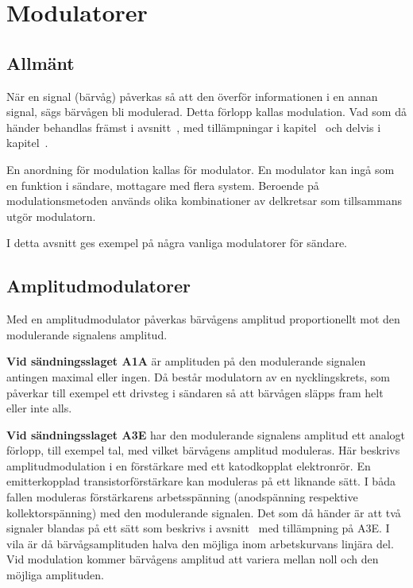 
\section{Modulatorer}

\subsection{Allmänt}

När en signal (bärvåg) påverkas så att den överför informationen i en annan
signal, sägs bärvågen bli modulerad.
Detta förlopp kallas modulation.
Vad som då händer behandlas främst i avsnitt~, med
tillämpningar i kapitel~ och delvis i kapitel~.

En anordning för modulation kallas för modulator.
En modulator kan ingå som en funktion i sändare, mottagare med flera system.
Beroende på modulationsmetoden används olika kombinationer av delkretsar som
tillsammans utgör modulatorn.

I detta avsnitt ges exempel på några vanliga modulatorer för sändare.

\subsection{Amplitudmodulatorer}

Med en amplitudmodulator påverkas bärvågens amplitud proportionellt
mot den modulerande signalens amplitud.

\textbf{Vid sändningsslaget A1A} är amplituden på den modulerande signalen
antingen maximal eller ingen.
Då består modulatorn av en nycklingskrets, som påverkar till exempel ett
drivsteg i sändaren så att bärvågen släpps fram helt eller inte alls.

\textbf{Vid sändningsslaget A3E} har den modulerande signalens amplitud
ett analogt förlopp, till exempel tal, med vilket bärvågens amplitud moduleras.
Här beskrivs amplitudmodulation i en förstärkare med ett katodkopplat
elektronrör.
En emitterkopplad transistorförstärkare kan moduleras på ett liknande sätt.
I båda fallen moduleras förstärkarens arbetsspänning (anodspänning respektive 
kollektorspänning) med den modulerande signalen.
Det som då händer är att två signaler blandas på ett sätt som beskrivs i
avsnitt~ med tillämpning på A3E.
I vila är då bärvågsamplituden halva den möjliga inom arbetskurvans linjära del.
Vid modulation kommer bärvågens amplitud att variera mellan noll
och den möjliga amplituden.


